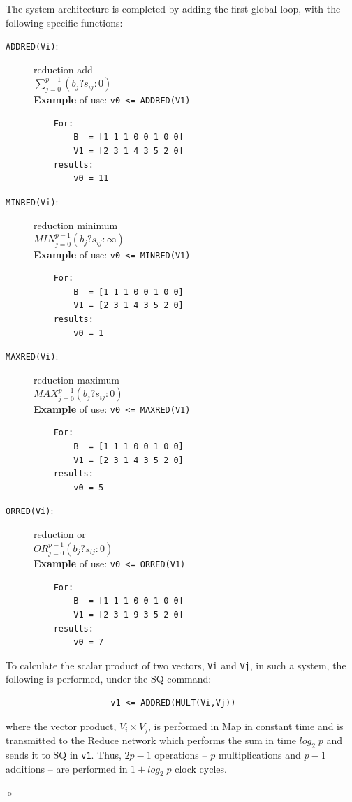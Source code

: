 The system architecture is completed by adding the first global loop, with the following specific functions:
    \begin{description}
        \item[{\tt ADDRED(Vi)}:] reduction add \\
        $\sum_{j=0}^{p-1} (b_j ? s_{ij} : 0)$ \\
         {\bf Example} of use: {\tt v0 <= ADDRED(V1)} \\
    \begin{verbatim}
    For:
        B  = [1 1 1 0 0 1 0 0]
        V1 = [2 3 1 4 3 5 2 0]
    results:
        v0 = 11
    \end{verbatim}
        \item[{\tt MINRED(Vi)}:] reduction minimum \\
        $MIN_{j=0}^{p-1}  (b_j ? s_{ij} : \infty)$ \\
        {\bf Example} of use: {\tt v0 <= MINRED(V1)} \\
    \begin{verbatim}
    For:
        B  = [1 1 1 0 0 1 0 0]
        V1 = [2 3 1 4 3 5 2 0]
    results:
        v0 = 1
         \end{verbatim}
        \item[{\tt MAXRED(Vi)}:] reduction maximum\\
        $MAX_{j=0}^{p-1} (b_j ? s_{ij} : 0)$ \\
         {\bf Example} of use: {\tt v0 <= MAXRED(V1)} \\
    \begin{verbatim}
    For:
        B  = [1 1 1 0 0 1 0 0]
        V1 = [2 3 1 4 3 5 2 0]
    results:
        v0 = 5
         \end{verbatim}
        \item[{\tt ORRED(Vi)}:] reduction or\\
        $OR_{j=0}^{p-1} (b_j ? s_{ij} : 0)$ \\
         {\bf Example} of use: {\tt v0 <= ORRED(V1)} \\
    \begin{verbatim}
    For:
        B  = [1 1 1 0 0 1 0 0]
        V1 = [2 3 1 9 3 5 2 0]
    results:
        v0 = 7
         \end{verbatim}
\end{description}

\begin{exemplu}
To calculate the scalar product of two vectors, {\tt Vi} and {\tt Vj}, in such a system, the following is performed, under the SQ command:
\begin{verbatim} 
                     v1 <= ADDRED(MULT(Vi,Vj))  
\end{verbatim}
where the vector product, $V_i \times V_j$, is performed in Map in constant time and is transmitted to the Reduce network which performs the sum in time $log_2 \; p$ and sends it to SQ in {\tt v1}. Thus, $2p-1$ operations -- $p$ multiplications and $p-1$ additions -- are performed in $1 + log_2 \; p$ clock cycles. 

$\diamond$
\end{exemplu}

